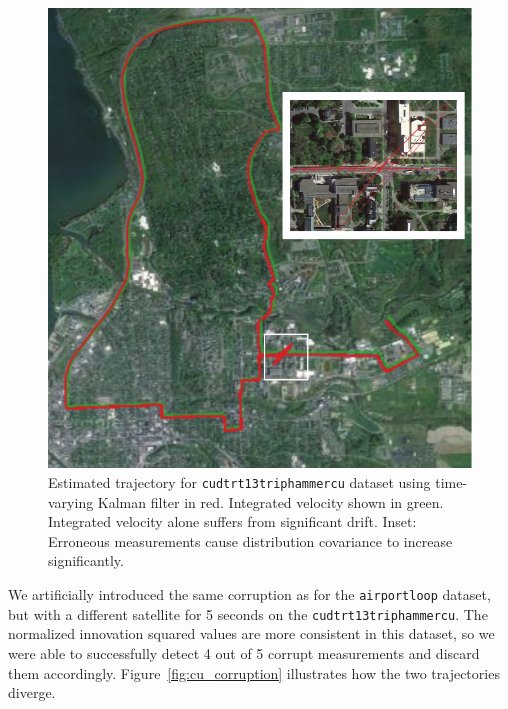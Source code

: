 \begin{figure}[!b]
\includegraphics[width=\columnwidth]{track2_map}
\caption{Estimated trajectory for \texttt{cudtrt13triphammercu} dataset using time-varying Kalman filter in red.  Integrated velocity shown in green.  Integrated velocity alone suffers from significant drift.  Inset: Erroneous measurements cause distribution covariance to increase significantly.}
\label{fig:track2_map}
\end{figure}

We artificially introduced the same corruption as for the \texttt{airportloop} dataset, but with a different satellite for 5 seconds on the \texttt{cudtrt13triphammercu}.  The normalized innovation squared values are more consistent in this dataset, so we were able to successfully detect 4 out of 5 corrupt measurements and discard them accordingly.  Figure~\ref{fig:cu_corruption} illustrates how the two trajectories diverge.

